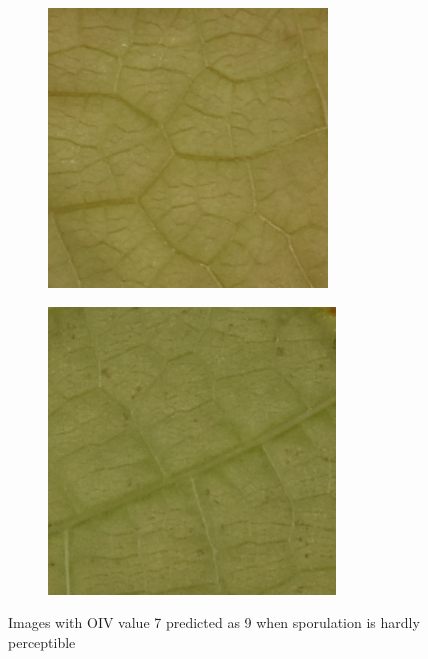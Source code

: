 \documentclass[english]{article}
\begin{document}
\begin{figure}[H]
    \centering
    \begin{subfigure}[b]{0.45\linewidth}
        \includegraphics[width=\linewidth]{error_79_2.png}
        \caption{}\label{fig:error79a}
    \end{subfigure}
    \begin{subfigure}[b]{0.45\linewidth}
        \includegraphics[width=\linewidth]{error_79_1.png}
        \caption{}\label{fig:error79b}
    \end{subfigure}
    \caption{Images with OIV value 7 predicted as 9 when sporulation is hardly perceptible}\label{fig:errors79}
\end{figure}
\end{document}
